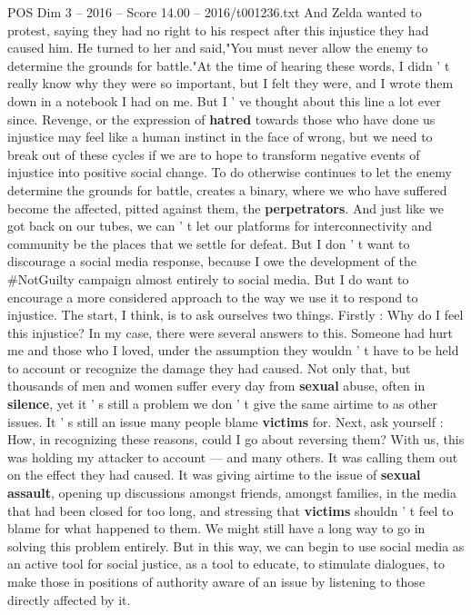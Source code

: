 \begin{textsample}{POS Dim 3 – 2016 – Score 14.00 – 2016/t001236.txt}
And Zelda wanted to protest, saying they had no right to his respect after this injustice they had caused him.
He turned to her and said,"You must never allow the enemy to determine the grounds for battle."At the time of hearing these words, I didn ' t really know why they were so important, but I felt they were, and I wrote them down in a notebook I had on me.
But I ' ve thought about this line a lot ever since.
Revenge, or the expression of \textbf{hatred} towards those who have done us injustice may feel like a human instinct in the face of wrong, but we need to break out of these cycles if we are to hope to transform negative events of injustice into positive social change.
To do otherwise continues to let the enemy determine the grounds for battle, creates a binary, where we who have suffered become the affected, pitted against them, the \textbf{perpetrators}.
And just like we got back on our tubes, we can ' t let our platforms for interconnectivity and community be the places that we settle for defeat.
But I don ' t want to discourage a social media response, because I owe the development of the \#NotGuilty campaign almost entirely to social media.
But I do want to encourage a more considered approach to the way we use it to respond to injustice.
The start, I think, is to ask ourselves two things.
Firstly : Why do I feel this injustice?
In my case, there were several answers to this.
Someone had hurt me and those who I loved, under the assumption they wouldn ' t have to be held to account or recognize the damage they had caused.
Not only that, but thousands of men and women suffer every day from \textbf{sexual} abuse, often in \textbf{silence}, yet it ' s still a problem we don ' t give the same airtime to as other issues.
It ' s still an issue many people blame \textbf{victims} for.
Next, ask yourself : How, in recognizing these reasons, could I go about reversing them?
With us, this was holding my attacker to account — and many others.
It was calling them out on the effect they had caused.
It was giving airtime to the issue of \textbf{sexual} \textbf{assault}, opening up discussions amongst friends, amongst families, in the media that had been closed for too long, and stressing that \textbf{victims} shouldn ' t feel to blame for what happened to them.
We might still have a long way to go in solving this problem entirely.
But in this way, we can begin to use social media as an active tool for social justice, as a tool to educate, to stimulate dialogues, to make those in positions of authority aware of an issue by listening to those directly affected by it.

\end{textsample}

